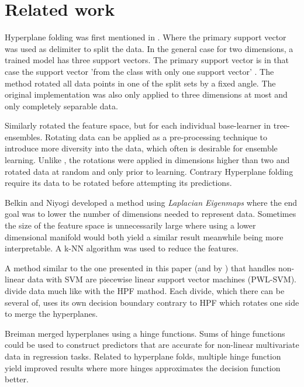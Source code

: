 \documentclass[a4paper,twoside]{bth}
\begin{document}
\chapter{Related work}
\par Hyperplane folding was first mentioned in  \cite{unpublished}. Where the primary support vector was used as delimiter to split the data. In the general case for two dimensions, a trained model has three support vectors. The primary support vector is in that case the support vector 'from the class with only one support vector' \cite{unpublished}. The method rotated all data points in one of the split sets by a fixed angle. The original implementation was also only applied to three dimensions at most and only completely separable data.

\par Similarly  \cite{PiotrRandomRotation} rotated the feature space, but for each individual base-learner in tree-ensembles. Rotating data can be applied as a pre-processing technique to introduce more diversity into the data, which often is desirable for ensemble learning. Unlike  \cite{unpublished}, the rotations were applied in dimensions higher than two and rotated data at random and only prior to learning. Contrary Hyperplane folding \cite{unpublished} require its data to be rotated before attempting its predictions.

\par Belkin and Niyogi \cite{Belkin:2003:LED:795523.795528} developed a method using \textit{Laplacian Eigenmaps} where the end goal was to lower the number of dimensions needed to represent data. Sometimes the size of the feature space is unnecessarily large where using a lower dimensional manifold would both yield a similar result meanwhile being more interpretable. A k-NN algorithm was used to reduce the features.

\par A method similar to the one presented in this paper (and by \cite{unpublished}) that handles non-linear data with SVM are piecewise linear support vector machines (PWL-SVM). \cite{PWLSVM} divide data much like \cite{unpublished} with the HPF mathod. Each divide, which there can be several of, uses its own decision boundary contrary to HPF which rotates one side to merge the hyperplanes.

\par Breiman \cite{hingeplane} merged hyperplanes using a hinge functions. Sums of hinge functions could be used to construct predictors that are accurate for non-linear multivariate data in regression tasks. Related to \cite{unpublished} hyperplane folds, multiple hinge function yield improved results where more hinges approximates the decision function better.
\end{document}
